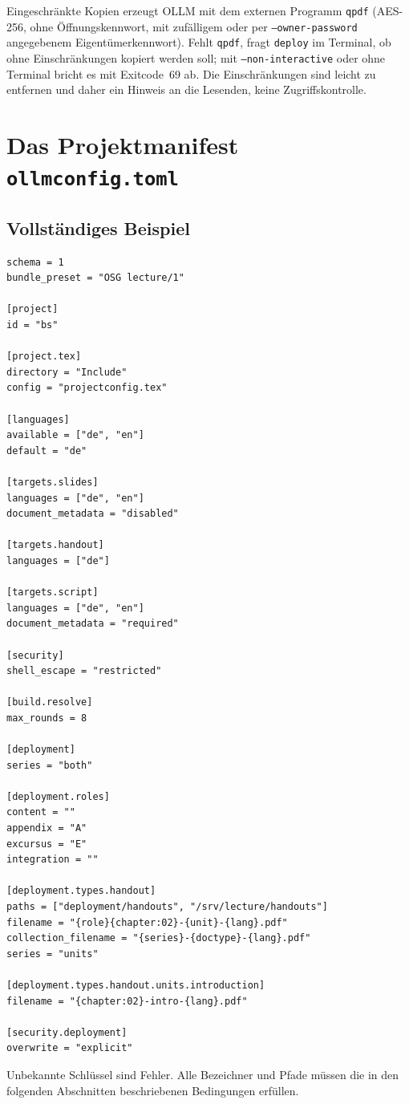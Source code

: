 \documentclass[
load-preamble+
]{osgdoc}
\begin{document}
Eingeschränkte Kopien erzeugt OLLM mit dem externen Programm \texttt{qpdf}
(AES-256, ohne Öffnungskennwort, mit zufälligem oder per
\texttt{--owner-password} angegebenem Eigentümerkennwort). Fehlt
\texttt{qpdf}, fragt \texttt{deploy} im Terminal, ob ohne Einschränkungen
kopiert werden soll; mit \texttt{--non-interactive} oder ohne Terminal bricht
es mit Exitcode~69 ab. Die Einschränkungen sind leicht zu entfernen und daher ein
Hinweis an die Lesenden, keine Zugriffskontrolle.

\section{Das Projektmanifest \texttt{ollmconfig.toml}}

\subsection{Vollständiges Beispiel}

\begin{verbatim}
schema = 1
bundle_preset = "OSG lecture/1"

[project]
id = "bs"

[project.tex]
directory = "Include"
config = "projectconfig.tex"

[languages]
available = ["de", "en"]
default = "de"

[targets.slides]
languages = ["de", "en"]
document_metadata = "disabled"

[targets.handout]
languages = ["de"]

[targets.script]
languages = ["de", "en"]
document_metadata = "required"

[security]
shell_escape = "restricted"

[build.resolve]
max_rounds = 8

[deployment]
series = "both"

[deployment.roles]
content = ""
appendix = "A"
excursus = "E"
integration = ""

[deployment.types.handout]
paths = ["deployment/handouts", "/srv/lecture/handouts"]
filename = "{role}{chapter:02}-{unit}-{lang}.pdf"
collection_filename = "{series}-{doctype}-{lang}.pdf"
series = "units"

[deployment.types.handout.units.introduction]
filename = "{chapter:02}-intro-{lang}.pdf"

[security.deployment]
overwrite = "explicit"
\end{verbatim}

Unbekannte Schlüssel sind Fehler. Alle Bezeichner und Pfade müssen die in den
folgenden Abschnitten beschriebenen Bedingungen erfüllen.
\end{document}
